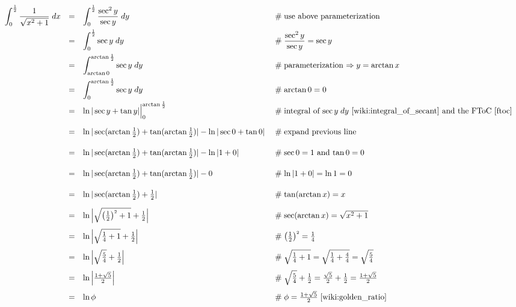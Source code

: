\documentclass{article}
\theoremstyle{definition}
\begin{document}
\begin{equation*}
\begin{array}{rcll} 
{\displaystyle \int_{0}^{\frac{1}{2}} \dfrac{1}{\sqrt{x^{2} + 1}} \;  dx} 
&=& {\displaystyle \int_{0}^{\frac{1}{2}} \dfrac{\sec^2 y}{\sec y} \;  dy}			
		&\; \mathrel{\#} \text{use above parameterization} \\
[10pt]
&=&{\displaystyle \int_{0}^{\frac{1}{2}} \sec y} \;  dy								
		&\; \mathrel{\#} \dfrac{\sec^2 y}{\sec y} = \sec y \\
[10pt]
&=&{\displaystyle \int_{\arctan 0}^{\arctan \frac{1}{2}} \sec y} \;  dy			
		&\; \mathrel{\#} \text{parameterization $\Rightarrow y = \arctan x$} \\
[10pt]
&=&{\displaystyle \int_{0}^{\arctan \frac{1}{2}} \sec y} \; dy			
		&\; \mathrel{\#} \arctan 0 = 0 \\
[8pt]
&=&{\displaystyle \ln | \sec y + \tan y | \Big |_{0}^{\arctan \frac{1}{2}}}			
		&\; \mathrel{\#} \text{integral of $\sec y \; dy$ \cite{wiki:integral_of_secant} 
		                       and the FToC \cite{ftoc}} \\
[14pt]
&=& \ln | \sec (\arctan \frac{1}{2}) + \tan (\arctan \frac{1}{2}) |  - \ln |\sec 0 + \tan 0 |
		&\; \mathrel{\#} \text{expand previous line} \\
[14pt]
&=& \ln | \sec (\arctan \frac{1}{2}) + \tan (\arctan \frac{1}{2}) |  - \ln |1 + 0 |
		&\; \mathrel{\#} \text{$\sec 0 = 1$ and $\tan 0 = 0$} \\
[14pt]
&=& \ln | \sec (\arctan \frac{1}{2}) + \tan (\arctan \frac{1}{2}) |  - 0
		&\; \mathrel{\#} \ln | 1 + 0| = \ln 1 = 0 \\
[14pt]
&=& \ln | \sec (\arctan \frac{1}{2}) + \frac{1}{2} |
		&\; \mathrel{\#} \tan(\arctan x) = x \\
[10pt]
&=& \ln \Big | \sqrt{\left (\frac{1}{2} \right )^{\mathsmaller 2} + 1} + \frac{1}{2} \Big |
		&\; \mathrel{\#} \text{$\sec({\arctan x}) = \sqrt{x^2 +1}$} \\
[10pt]
&=& \ln \Big | \sqrt{\frac{1}{4} + 1} + \frac{1}{2} \Big |
		&\; \mathrel{\#} {\left ( \frac{1}{2} \right ) }^{\mathsmaller 2} = \frac{1}{4} \\
[10pt]
&=& \ln \Big | \sqrt{\frac{5}{4}} + \frac{1}{2} \Big |
		&\; \mathrel{\#} \sqrt{\frac{1}{4} + 1} = \sqrt{\frac{1}{4} + \frac{4}{4}} = \sqrt{\frac{5}{4}} \\
[10pt]
&=& \ln \Big | \frac{1 + \sqrt{5}}{2} \Big |
		&\; \mathrel{\#} \sqrt{\frac{5}{4}} + \frac{1}{2} = \frac{\sqrt{5}}{2} + \frac{1}{2} = \frac{1 + \sqrt{5}}{2} \\
[10pt]
&=& \ln \phi
		&\; \mathrel{\#} \phi =  \frac{1 + \sqrt{5}}{2} \; \cite{wiki:golden_ratio}
\end{array}
\end{equation*}
%
%
%
\end{document}
